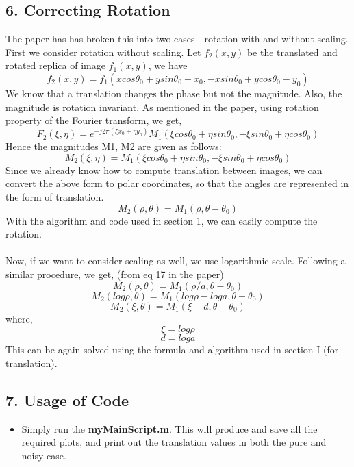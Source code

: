 \documentclass[12pt, a4paper]{article}
\begin{document}
\subsection*{6. Correcting Rotation}
The paper has has broken this into two cases - rotation with and without scaling. \\
First we consider rotation without scaling. Let $f_2(x,y)$ be the translated and rotated replica of image $f_1(x,y)$, we have
$$f_2(x,y) = f_1(xcos\theta_0 + ysin\theta_0 - x_0, -xsin\theta_0 + ycos\theta_0 - y_0)$$
We know that a translation changes the phase but not the magnitude. Also, the magnitude is rotation invariant. As mentioned in the paper, using rotation property of the Fourier transform, we get,
$$F_2(\xi ,\eta) = e^{-j2\pi(\xi x_0 + \eta y_0)} M_1(\xi cos\theta_0 + \eta sin\theta_0, -\xi sin\theta_0 + \eta cos\theta_0)$$
Hence the magnitudes M1, M2 are given as follows:
$$M_2(\xi ,\eta) = M_1(\xi cos\theta_0 + \eta sin\theta_0, -\xi sin\theta_0 + \eta cos\theta_0)$$
Since we already know how to compute translation between images, we can convert the above form to polar coordinates, so that the angles are represented in the form of translation.
$$M_2(\rho ,\theta) = M_1(\rho ,\theta-\theta_0)$$
With the algorithm and code used in section 1, we can easily compute the rotation. \\ \\ 
Now, if we want to consider scaling as well, we use logarithmic scale. Following a similar procedure, we get, (from eq 17 in the paper)
$$M_2(\rho ,\theta) = M_1(\rho/a ,\theta-\theta_0)$$
$$M_2(log\rho ,\theta) = M_1(log\rho - loga ,\theta-\theta_0)$$
$$M_2(\xi ,\theta) = M_1(\xi - d ,\theta-\theta_0)$$
where,
$$\xi = log\rho$$
$$d = loga$$
This can be again solved using the formula and algorithm used in section I (for translation).
\subsection*{7. Usage of Code}
\begin{itemize}
\item Simply run the \textbf{myMainScript.m}. This will produce and save all the required plots, and print out the translation values in both the pure and noisy case.
\end{itemize}
\end{document}

